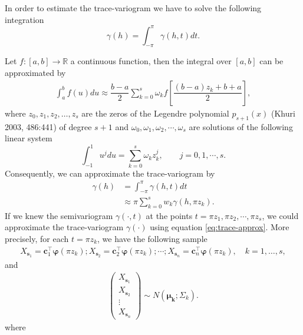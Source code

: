 \documentclass[
  12pt,
]{article}
\theoremstyle{definition}
\theoremstyle{definition}
\theoremstyle{definition}
\theoremstyle{remark}
\begin{document}
In order to estimate the trace-variogram we have to solve the following integration
\begin{equation}
\gamma(h) = \int_{-\pi}^{\pi} \gamma(h,t) dt.
\label{eq:trace-variogram}
\end{equation}

Let \(f:[a,b] \longrightarrow \mathbb{R}\) a continuous function, then the integral over \([a,b]\) can be approximated by
\begin{align*}
\int_{a}^{b} f(u) du \approx \dfrac{b-a}{2} \sum_{k=0}^{s} \omega_k f \left[\dfrac{(b-a)z_k + b +a}{2}\right],
\end{align*}
where \(z_0,z_1, z_2, \dots, z_s\) are the zeros of the Legendre polynomial \(p_{s+1}(x)\) (Khuri 2003, 486:441) of degree \(s + 1\) and \(\omega_0,\omega_1, \omega_2, \cdots, \omega_s\) are solutions of the following linear system
\begin{equation*}
\int_{-1}^{1} u^j du= \sum_{k=0}^{s} \omega_k z_k^j, \qquad j=0,1, \cdots, s.
\end{equation*}
Consequently, we can approximate the trace-variogram by
\begin{align}
\nonumber \gamma(h) &= \int_{-\pi}^{\pi} \gamma(h, t)dt \\
&\approx  \pi \sum_{k=0}^{s} w_k \gamma \left( h, \pi z_k \right).
\label{eq:trace-approx}
\end{align}
If we knew the semivariogram \(\gamma(\cdot,t)\) at the points \(t=\pi z_1, \pi z_2, \cdots, \pi z_s\), we could approximate the trace-variogram \(\gamma(\cdot)\) using equation \eqref{eq:trace-approx}. More precisely, for each \(t=\pi z_k\), we have the following sample
\begin{align*}
 X_{\bm{s}_1} = \bm{c}_1^\top \bm{\varphi}(\pi z_k); X_{\bm{s}_2} = \bm{c}_2^\top \bm{\varphi}(\pi z_k); \cdots; X_{\bm{s}_n} = \bm{c}_n^\top \bm{\varphi}(\pi z_k), \quad k=1, \dots, s,
\end{align*}
and
\begin{align*}
 \begin{pmatrix}
  X_{\bm{s}_1}\\
  X_{\bm{s}_2}\\
  \vdots\\
  X_{\bm{s}_n}
 \end{pmatrix}
\sim N\left(\bm{\mu_k};\Sigma_k \right).
\end{align*}
where
\end{document}
